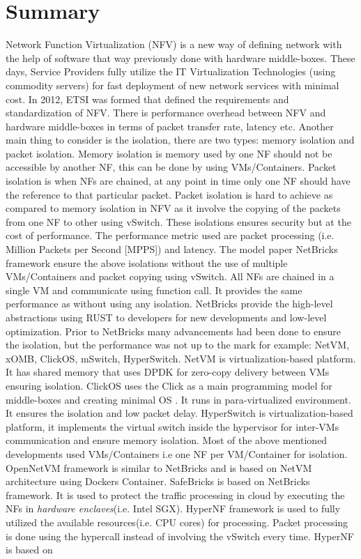 \documentclass[12pt,twoside,doublepage]{article}
\begin{document}
\section*{Summary}
Network Function Virtualization (NFV) is a new way of defining network with the help of software that way previously done with hardware middle-boxes. These days, Service Providers fully utilize the IT Virtualization Technologies (using commodity servers) for fast deployment of new network services with minimal cost. In 2012, ETSI\cite{ETSI2012} was formed that defined the requirements and standardization of NFV. There is performance overhead between NFV and hardware middle-boxes in terms of packet transfer rate, latency etc. Another main thing to consider is the isolation, there are two types: memory isolation and packet isolation. Memory isolation is memory used by one NF should not be accessible by another NF, this can be done by using VMs/Containers. Packet isolation is when NFs are chained, at any point in time only one NF should have the reference to that particular packet. Packet isolation is hard to achieve as compared to memory isolation in NFV as it involve the copying of the packets from one NF to other using vSwitch. These isolations ensures security but at the cost of performance. The performance metric used are packet processing (i.e. Million Packets per Second [MPPS]) and latency. The model paper NetBricks\cite{Panda2016} framework ensure the above isolations without the use of multiple VMs/Containers and packet copying using vSwitch. All NFs are chained in a single VM and communicate using function call. It provides the same performance as without using any isolation. NetBricks provide the high-level abstractions using RUST\cite{TheRustTeam2016} to developers for new developments and low-level optimization. Prior to NetBricks many advancements had been done to ensure the isolation, but the performance was not up to the mark for example: NetVM\cite{Hwang2015}, xOMB\cite{Anderson2012}, ClickOS\cite{Martins2014}, mSwitch\cite{Honda2015}, HyperSwitch\cite{Ram2013}. NetVM is virtualization-based platform. It has shared memory that uses DPDK\cite{Corporation2014} for zero-copy delivery between VMs ensuring isolation. ClickOS uses the Click\cite{Kohler2000} as a main programming model for middle-boxes and creating minimal OS . It runs in para-virtualized environment. It ensures the isolation and low packet delay. HyperSwitch is virtualization-based platform, it implements the virtual switch inside the hypervisor for inter-VMs communication and ensure memory isolation. Most of the above mentioned developments used VMs/Containers i.e one NF per VM/Container for isolation. OpenNetVM\cite{Yurchenko2018} framework is similar to NetBricks and is based on NetVM architecture using Dockers Container. SafeBricks\cite{Poddar2018} is based on NetBricks framework. It is used to protect the traffic processing in cloud by executing the NFs in \textit{hardware enclaves}(i.e. Intel SGX\cite{McKeen2013}). HyperNF\cite{Yasukata2017} framework is used to fully utilized the available resources(i.e. CPU cores) for processing. Packet processing is done using the hypercall instead of involving the vSwitch every time. HyperNF is based on 
\end{document}
